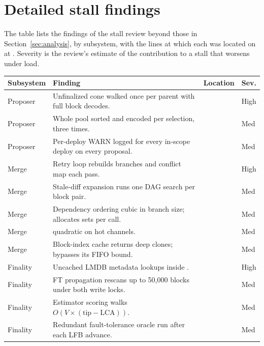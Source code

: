 \section{Detailed stall findings}\label{app:findings}

The table lists the findings of the stall review beyond those in Section~\ref{sec:analysis}, by subsystem, with the lines at which each was located on  at . Severity is the review's estimate of the contribution to a stall that worsens under load.

\begin{longtable}{@{}P{2.3cm}P{7.9cm}P{3.6cm}P{1.0cm}@{}}
\toprule
\textbf{Subsystem} & \textbf{Finding} & \textbf{Location} & \textbf{Sev.} \\
\midrule
\endhead
Proposer & Unfinalized cone walked once per parent with full block decodes. &  & High \\
Proposer & Whole pool sorted and encoded per selection, three times. &  & Med \\
Proposer & Per-deploy WARN logged for every in-scope deploy on every proposal. &  & Med \\
Merge & Retry loop rebuilds branches and conflict map each pass. &  & High \\
Merge & Stale-diff expansion runs one DAG search per block pair. &  & Med \\
Merge & Dependency ordering cubic in branch size;  allocates sets per call. &  & Med \\
Merge &  quadratic on hot channels. &  & Med \\
Merge & Block-index cache returns deep clones; bypasses its FIFO bound. &  & Med \\
Finality & Uncached LMDB metadata lookups inside . &  & High \\
Finality & FT propagation rescans up to 50{,}000 blocks under both write locks. &  & Med \\
Finality & Estimator scoring walks $O(V \times (\text{tip}-\text{LCA}))$. &  & Med \\
Finality & Redundant fault-tolerance oracle run after each LFB advance. &  & Med \\

\end{longtable}
